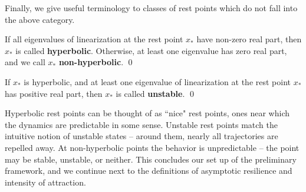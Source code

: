 Finally, we give useful terminology to classes of rest points which do not fall into the above category. 

\begin{definition}
	If all eigenvalues of linearization at the rest point $x_{\ast}$ have non-zero real part, then $x_{\ast}$ is called \textbf{hyperbolic}. Otherwise, at least one eigenvalue has zero real part, and we call $x_{\ast}$ \textbf{non-hyperbolic}.
	\qed
\end{definition}

\begin{definition}
	If $x_{\ast}$ is hyperbolic, and at least one eigenvalue of linearization at the rest point $x_{\ast}$ has positive real part, then $x_{\ast}$ is called \textbf{unstable}. 
	\qed
\end{definition}

Hyperbolic rest points can be thought of as ``nice" rest points, ones near which the dynamics are predictable in some sense. Unstable rest points match the intuitive notion of unstable states -- around them, nearly all trajectories are repelled away. At non-hyperbolic points the behavior is unpredictable -- the point may be stable, unstable, or neither. This concludes our set up of the preliminary framework, and we continue next to the definitions of asymptotic resilience and intensity of attraction.



%


